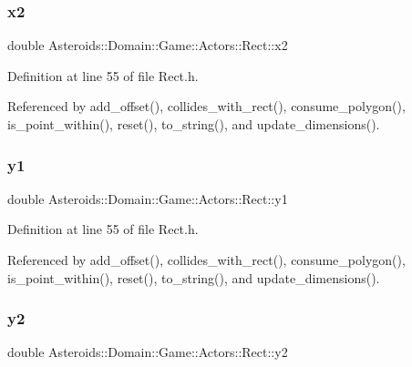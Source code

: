 \subsubsection{\texorpdfstring{x2}{x2}}
{\footnotesize\ttfamily double Asteroids\+::\+Domain\+::\+Game\+::\+Actors\+::\+Rect\+::x2}



Definition at line 55 of file Rect.\+h.



Referenced by add\+\_\+offset(), collides\+\_\+with\+\_\+rect(), consume\+\_\+polygon(), is\+\_\+point\+\_\+within(), reset(), to\+\_\+string(), and update\+\_\+dimensions().

\mbox{\label{classAsteroids_1_1Domain_1_1Game_1_1Actors_1_1Rect_acb50ec000477a068fb723dc5a184cdbe}} 
\subsubsection{\texorpdfstring{y1}{y1}}
{\footnotesize\ttfamily double Asteroids\+::\+Domain\+::\+Game\+::\+Actors\+::\+Rect\+::y1}



Definition at line 55 of file Rect.\+h.



Referenced by add\+\_\+offset(), collides\+\_\+with\+\_\+rect(), consume\+\_\+polygon(), is\+\_\+point\+\_\+within(), reset(), to\+\_\+string(), and update\+\_\+dimensions().

\mbox{\label{classAsteroids_1_1Domain_1_1Game_1_1Actors_1_1Rect_a85994dc2dcf0a09c649958b1fb8e6983}} 
\subsubsection{\texorpdfstring{y2}{y2}}
{\footnotesize\ttfamily double Asteroids\+::\+Domain\+::\+Game\+::\+Actors\+::\+Rect\+::y2}



